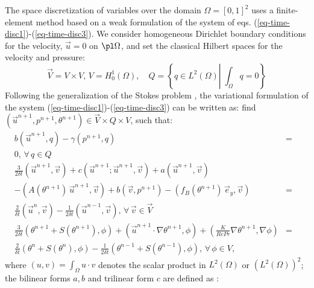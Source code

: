 The space discretization of variables over the domain $\Omega=[0,1]^2$ uses a finite-element method based on a weak formulation of the system of eqs. (\ref{eq-time-disc1})-(\ref{eq-time-disc3}). 
We consider homogeneous Dirichlet boundary conditions for the velocity, \ie $\vec{u}=0$ on $\pl \Omega$, and set the classical Hilbert spaces for the velocity and pressure:
\begin{equation}
\vec{V}=V\times V, \, V=H^1_0(\Omega), \quad Q=\left\{q\in L^2(\Omega)\left|\; \int_{\Omega}q=0\right.\right\}
\end{equation}
Following the generalization of the Stokes problem \citep{Temam,GRaviart,Quarteroni}, the variational formulation of the system  (\ref{eq-time-disc1})-(\ref{eq-time-disc3}) can be written as: find $(\vec{u}^{n+1}, p^{n+1}, \theta^{n+1}) \in \vec{V}\times Q\times V$, such that:
\begin{eqnarray}
\label{eq-weak-all}
b\left(\vec{u}^{n+1}, q\right) - \gamma (p^{n+1},q)&=& \\ \nonumber
0, \, \forall \, q \in Q \\ %
\frac{3}{2 \delta t} \left(\vec{u}^{n+1},\vec{v}\right) + c\left(\vec{u}^{n+1} ; \vec{u}^{n+1}, \vec{v} \right) +
{a\left(\vec{u}^{n+1}, \vec{v}\right)} & &\\ \nonumber
- (A(\theta^{n+1}) \, \vec u^{n+1},\vec v)+ b\left(\vec{v}, p^{n+1}\right)
- {\left(f_B(\theta^{n+1}) \, \vec{e}_y,\vec{v}\right)}
&=& \\ \nonumber
\frac{2}{\delta t} \left(\vec{u}^{n},\vec{v}\right) 
- \frac{1}{2 \delta t} \left(\vec{u}^{n-1},\vec{v}\right), \, \forall \, \vec{v} \in \vec{V}\\ \label{eq-weak-energy}  %
\frac{3}{2 \delta t} \left(\theta^{n+1} + S(\theta^{n+1}), \phi\right)
+\left(\vec{u}^{n+1} \cdot \nabla \theta^{n+1} , \phi
\right) +
\left( \frac{K}{Re Pr} \nabla \theta^{n+1}, \nabla \phi \right) &=& \\  \nonumber
\frac{2}{\delta t} \left( \theta^{n}+S(\theta^n), \phi\right)
- \frac{1}{2 \delta t} \left( \theta^{n-1}+S(\theta^{n-1}), \phi\right),\, \forall \, \phi \in V,
\end{eqnarray}
where {$(u , v)=\int_{\Omega} u\cdot v$} denotes the scalar product in $L^2(\Omega)$ or $\left(L^2(\Omega)\right)^2$; the bilinear forms $a, b$ and trilinear form $c$ are defined as \cite{GRaviart,Quarteroni}:
